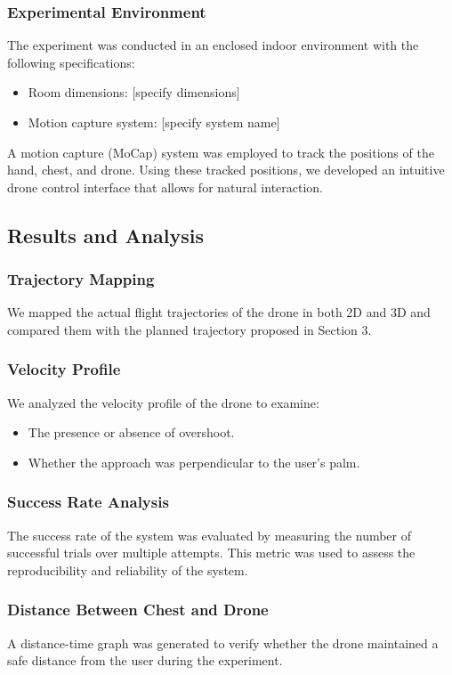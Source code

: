\subsubsection{Experimental Environment}
The experiment was conducted in an enclosed indoor environment with the following specifications:
\begin{itemize}
    \item Room dimensions: [specify dimensions]
    \item Motion capture system: [specify system name]
\end{itemize}

A motion capture (MoCap) system was employed to track the positions of the hand, chest, and drone. Using these tracked positions, we developed an intuitive drone control interface that allows for natural interaction.


\subsection{Results and Analysis}

\subsubsection{Trajectory Mapping}
We mapped the actual flight trajectories of the drone in both 2D and 3D and compared them with the planned trajectory proposed in Section 3.

\subsubsection{Velocity Profile}
We analyzed the velocity profile of the drone to examine:
\begin{itemize}
    \item The presence or absence of overshoot.
    \item Whether the approach was perpendicular to the user’s palm.
\end{itemize}

\subsubsection{Success Rate Analysis}
The success rate of the system was evaluated by measuring the number of successful trials over multiple attempts. This metric was used to assess the reproducibility and reliability of the system.

\subsubsection{Distance Between Chest and Drone}
A distance-time graph was generated to verify whether the drone maintained a safe distance from the user during the experiment.


